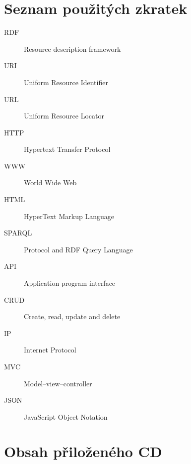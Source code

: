 \documentclass[thesis=B,czech]{FITthesis}[2012/06/26]
\begin{document}
\chapter{Seznam použitých zkratek}
\begin{description}
	\item[RDF] Resource description framework
	\item[URI] Uniform Resource Identifier
	\item[URL] Uniform Resource Locator
	\item[HTTP] Hypertext Transfer Protocol
	\item[WWW] World Wide Web
	\item[HTML] HyperText Markup Language
	\item[SPARQL] Protocol and RDF Query Language
	\item[API] Application program interface
	\item[CRUD] Create, read, update and delete
	\item[IP] Internet Protocol 
	\item[MVC] Model–view–controller
	\item[JSON] JavaScript Object Notation
\end{description}



\chapter{Obsah přiloženého CD}
\begin{figure}[H]
\end{figure}
\end{document}

